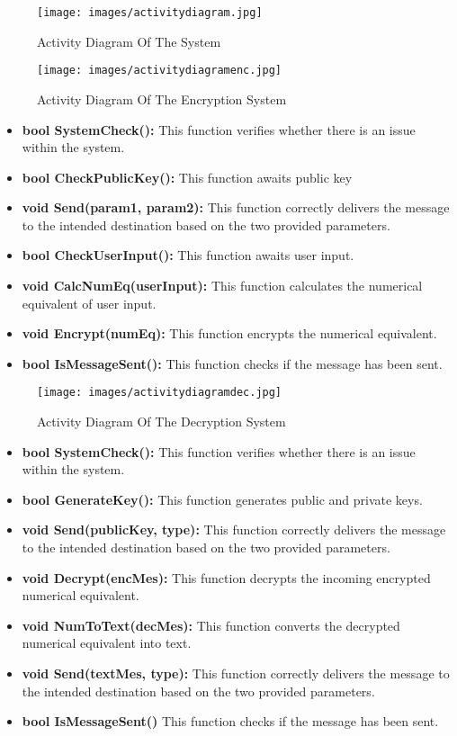 \documentclass[12pt]{article}
\begin{document}
 	\begin{figure}[H]
 		\centering
 		\label{Uml Diagram Of The System}
 		\texttt{[image: images/activitydiagram.jpg]}\\[0.5 cm]	
 		\caption{Activity Diagram Of The System} 		
 	\end{figure}
 \newpage
 	\begin{figure}[H]
 	\centering
 	\label{Enc Diagram}
 	\texttt{[image: images/activitydiagramenc.jpg]}\\[0.5 cm]	
 	\caption{Activity Diagram Of The Encryption System } 		
 \end{figure}
\begin{itemize}
	\item \textbf{bool SystemCheck():} This function verifies whether there is an issue within the system.
	\item \textbf{bool CheckPublicKey():} This function awaits public key
	\item \textbf{void Send(param1, param2):} 
	This function correctly delivers the message to the intended destination based on the two provided parameters.
	\item \textbf{bool CheckUserInput():}  This function awaits user input.
	\item \textbf{void CalcNumEq(userInput):} This function calculates the numerical equivalent of user input.
	\item \textbf{void Encrypt(numEq):} This function encrypts the numerical equivalent.
	\item \textbf {bool IsMessageSent():} This function checks if the message has been sent.
\end{itemize}
 \newpage
\begin{figure}[H]
	\centering
	\label{dec Diagram}
	\texttt{[image: images/activitydiagramdec.jpg]}\\[0.5 cm]	
	\caption{Activity Diagram Of The Decryption System } 		
\end{figure}
\begin{itemize}
	\item \textbf{bool SystemCheck():}  This function verifies whether there is an issue within the system.
	\item \textbf{bool GenerateKey():} This function generates public and private keys.
	\item \textbf{void Send(publicKey, type):} 	This function correctly delivers the message to the intended destination based on the two provided parameters.
	\item \textbf{void Decrypt(encMes):} This function decrypts the incoming encrypted numerical equivalent.
	\item \textbf{void NumToText(decMes):} This function converts the decrypted numerical equivalent into text.
	\item \textbf{void Send(textMes, type):} This function correctly delivers the message to the intended destination based on the two provided parameters.
	\item \textbf {bool IsMessageSent()} This function checks if the message has been sent.
\end{itemize}
\end{document}
